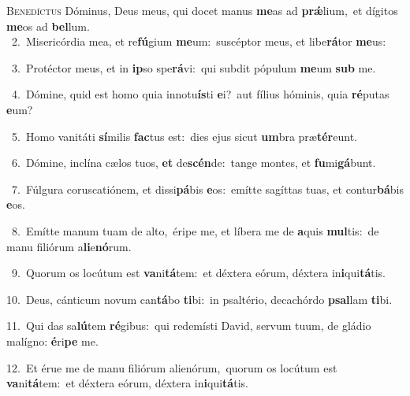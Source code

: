 \lettrine{\initial\textcolor{\initialcolor}{B}}{enedíctus} Dóminus, Deus meus, qui docet manus \textbf{me}\-as ad \textbf{prǽ}\-lium,~\star et dígitos \textbf{me}\-os ad \textbf{bel}\-lum.\\
{\numbfont\textcolor{\numbcolor}{~2.}}~Misericórdia mea, et re\-\textbf{fú}\-gium \textbf{me}\-um:~\star suscéptor meus, et libe\-\textbf{rá}\-tor \textbf{me}\-us:\par
{\numbfont\textcolor{\numbcolor}{~3.}}~Protéctor meus, et in \textbf{ip}\-so spe\-\textbf{rá}\-vi:~\star qui subdit pópulum \textbf{me}\-um \textbf{sub} me.\par
{\numbfont\textcolor{\numbcolor}{~4.}}~Dómine, quid est homo quia innotu\-\textbf{ís}\-ti \textbf{e}\-i?~\star aut fílius hóminis, quia \textbf{ré}\-putas \textbf{e}\-um?\par
{\numbfont\textcolor{\numbcolor}{~5.}}~Homo vanitáti \textbf{sí}\-milis \textbf{fac}\-tus est:~\star dies ejus sicut \textbf{um}\-bra præ\-\textbf{tér}\-eunt.\par
{\numbfont\textcolor{\numbcolor}{~6.}}~Dómine, inclína cælos tuos, \textbf{et} de\-\textbf{scén}\-de:~\star tange montes, et \textbf{fu}\-mi\-\textbf{gá}\-bunt.\par
{\numbfont\textcolor{\numbcolor}{~7.}}~Fúlgura coruscatiónem, et dissi\-\textbf{pá}\-bis \textbf{e}\-os:~\star emítte sagíttas tuas, et contur\-\textbf{bá}\-bis \textbf{e}\-os.\par
{\numbfont\textcolor{\numbcolor}{~8.}}~Emítte manum tuam de alto,~\dagger éripe me, et líbera me de \textbf{a}\-quis \textbf{mul}\-tis:~\star de manu filiórum a\-\textbf{li}\-e\-\textbf{nó}\-rum.\par
{\numbfont\textcolor{\numbcolor}{~9.}}~Quorum os locútum est \textbf{va}\-ni\-\textbf{tá}\-tem:~\star et déxtera eórum, déxtera in\-\textbf{i}\-qui\-\textbf{tá}\-tis.\par
{\numbfont\textcolor{\numbcolor}{10.}}~Deus, cánticum novum can\-\textbf{tá}\-bo \textbf{ti}\-bi:~\star in psaltério, decachórdo \textbf{psal}\-lam \textbf{ti}\-bi.\par
{\numbfont\textcolor{\numbcolor}{11.}}~Qui das sa\-\textbf{lú}\-tem \textbf{ré}\-gibus:~\star qui redemísti David, servum tuum, de gládio malígno: \textbf{é}\-ri\textbf{pe} me.\par
{\numbfont\textcolor{\numbcolor}{12.}}~Et érue me de manu filiórum alienórum,~\dagger quorum os locútum est \textbf{va}\-ni\-\textbf{tá}\-tem:~\star et déxtera eórum, déxtera in\-\textbf{i}\-qui\-\textbf{tá}\-tis.\par
